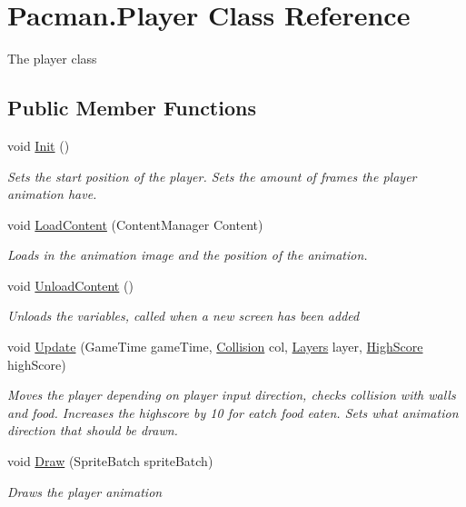 \hypertarget{class_pacman_1_1_player}{\section{Pacman.\-Player Class Reference}
\label{class_pacman_1_1_player}
}


The player class  


\subsection*{Public Member Functions}
\begin{DoxyCompactItemize}
\item 
void \hyperlink{class_pacman_1_1_player_aba5e30a8301ffc0ab664300d95ab9743}{Init} ()
\begin{DoxyCompactList}\small\item\em Sets the start position of the player. Sets the amount of frames the player animation have. \end{DoxyCompactList}\item 
void \hyperlink{class_pacman_1_1_player_ab8c4719d16a15c9574a8013807602465}{Load\-Content} (Content\-Manager Content)
\begin{DoxyCompactList}\small\item\em Loads in the animation image and the position of the animation. \end{DoxyCompactList}\item 
void \hyperlink{class_pacman_1_1_player_a68af2a48b6d3f9512ee28aaa30a71f48}{Unload\-Content} ()
\begin{DoxyCompactList}\small\item\em Unloads the variables, called when a new screen has been added \end{DoxyCompactList}\item 
void \hyperlink{class_pacman_1_1_player_af638b60bf7a47f1f31d5ce8b49574d49}{Update} (Game\-Time game\-Time, \hyperlink{class_pacman_1_1_collision}{Collision} col, \hyperlink{class_pacman_1_1_layers}{Layers} layer, \hyperlink{class_pacman_1_1_high_score}{High\-Score} high\-Score)
\begin{DoxyCompactList}\small\item\em Moves the player depending on player input direction, checks collision with walls and food. Increases the highscore by 10 for eatch food eaten. Sets what animation direction that should be drawn. \end{DoxyCompactList}\item 
void \hyperlink{class_pacman_1_1_player_a5b1cc5c97a3a5a1288b8612bd640e9f7}{Draw} (Sprite\-Batch sprite\-Batch)
\begin{DoxyCompactList}\small\item\em Draws the player animation \end{DoxyCompactList}\end{DoxyCompactItemize}
